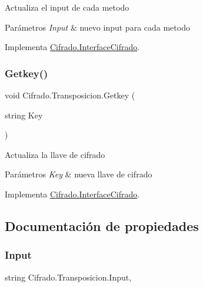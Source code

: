 Actualiza el input de cada metodo 


\begin{DoxyParams}{Parámetros}
{\em Input} & nuevo input para cada metodo\\
\hline
\end{DoxyParams}


Implementa \hyperlink{interface_cifrado_1_1_interface_cifrado_ab573118c8f88269038b21e452a9fa8d3}{Cifrado.\+Interface\+Cifrado}.

\mbox{\label{class_cifrado_1_1_transposicion_ab35db490c8543ccb453b4384ad4e236c}} 
\subsubsection{\texorpdfstring{Getkey()}{Getkey()}}
{\footnotesize\ttfamily void Cifrado.\+Transposicion.\+Getkey (\begin{DoxyParamCaption}\item[{string}]{Key }\end{DoxyParamCaption})}



Actualiza la llave de cifrado 


\begin{DoxyParams}{Parámetros}
{\em Key} & nueva llave de cifrado\\
\hline
\end{DoxyParams}


Implementa \hyperlink{interface_cifrado_1_1_interface_cifrado_a0eee6d795ffd5d8f9971e1d8fb6f4b8d}{Cifrado.\+Interface\+Cifrado}.



\subsection{Documentación de propiedades}
\mbox{\label{class_cifrado_1_1_transposicion_ae35952dd0b3f5c626fa4f7c084428f8a}} 
\subsubsection{\texorpdfstring{Input}{Input}}
{\footnotesize\ttfamily string Cifrado.\+Transposicion.\+Input\hspace{0.3cm}{\ttfamily [get]}, {\ttfamily [set]}}



